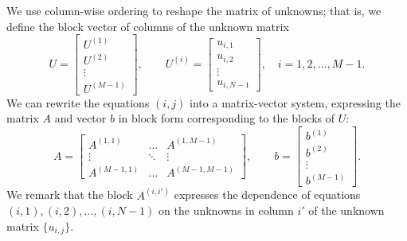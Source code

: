 \documentclass{homework}
\begin{document}
\begin{alphaparts}
		We use column-wise ordering to reshape the matrix of unknowns; that is, we define the block vector of columns of the unknown matrix
		\begin{equation*}
			U = \left[\begin{matrix}U^{(1)} \\ U^{(2)} \\ \vdots \\ U^{(M-1)}\end{matrix}\right], \qquad U^{(i)} = \left[\begin{matrix}u_{i,1} \\ u_{i,2} \\ \vdots \\ u_{i, N-1}\end{matrix}\right], \quad i =1,2,\dots, M-1.
		\end{equation*}
		We can rewrite the equations $(i,j)$ into a matrix-vector system, expressing the matrix $A$ and vector $b$ in block form corresponding to the blocks of $U$:
		\begin{equation*}
			A = \left[\begin{matrix}A^{(1,1)} &\hdots& A^{(1,M-1)} \\\vdots &\ddots & \vdots \\ A^{(M-1,1)} & \hdots & A^{(M-1,M-1)}\end{matrix}\right], \qquad b = \left[\begin{matrix}b^{(1)} \\ b^{(2)} \\ \vdots \\ b^{(M-1)}\end{matrix}\right].
		\end{equation*}
		We remark that the block $A^{(i,i')}$ expresses the dependence of equations $(i,1), (i,2), \dots, (i, N-1)$ on the unknowns in column $i'$ of the unknown matrix $\{u_{i,j}\}$. 
		

\end{alphaparts}
\end{document}
